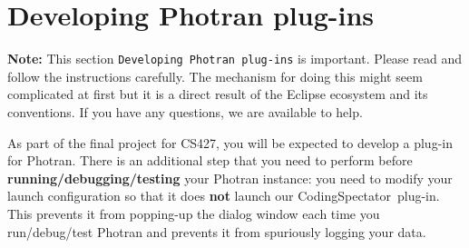 \documentclass{article}
\newcommand\codspec{CodingSpectator}
\newcommand\warnnote[1]{\textbf{Note: }#1}
\newcommand\uiref[1]{\texttt{#1}}
\begin{document}
\section{Developing Photran plug-ins}

\warnnote{This section \uiref{Developing Photran plug-ins} is important. Please
read and follow the instructions carefully. The mechanism for doing this might
seem complicated at first but it is a direct result of the Eclipse ecosystem and
its conventions. If you have any questions, we are available to help.}

As part of the final project for CS427, you will be expected to develop a
plug-in for Photran. There is an additional step that you need to perform before
\textbf{running/debugging/testing} your Photran instance: you need to modify
your launch configuration so that it does \textbf{not} launch our \codspec\
plug-in.  This prevents it from popping-up the dialog window each time you
run/debug/test Photran and prevents it from spuriously logging your data.
\end{document}
